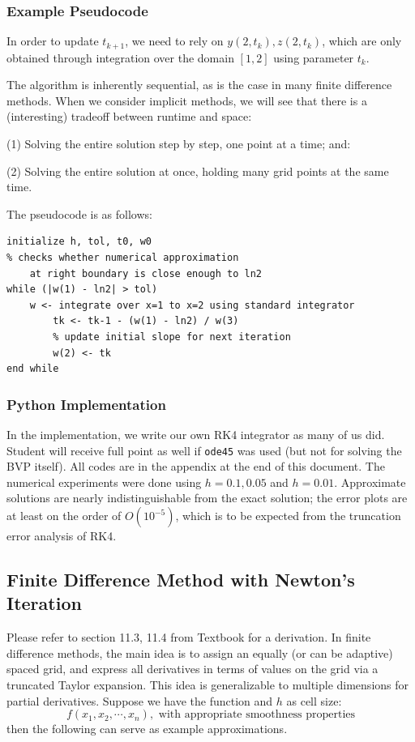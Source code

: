 \documentclass[12pt]{article} %
\newcommand{\1}[1]{\mathds{1}\left[#1\right]}
\begin{document}
\subsubsection{Example Pseudocode}
In order to update $t_{k+1}$, we need to rely on $y(2,t_k), z(2, t_k)$, which are only obtained through integration over the domain $[1,2]$ using parameter $t_k$.

The algorithm is inherently sequential, as is the case in many finite difference methods. When we consider implicit methods, we will see that there is a (interesting) tradeoff between runtime and space:

(1) Solving the entire solution step by step, one point at a time; and:

(2) Solving the entire solution at once, holding many grid points at the same time.

The pseudocode is as follows:
\begin{verbatim}
initialize h, tol, t0, w0
% checks whether numerical approximation 
	at right boundary is close enough to ln2
while (|w(1) - ln2| > tol)
    w <- integrate over x=1 to x=2 using standard integrator
	    tk <- tk-1 - (w(1) - ln2) / w(3)
	    % update initial slope for next iteration
	    w(2) <- tk
end while 
\end{verbatim}
\subsubsection{Python Implementation}
In the implementation, we write our own RK4 integrator as many of us did. Student will receive full point as well if \texttt{ode45} was used (but not for solving the BVP itself). All codes are in the appendix at the end of this document. The numerical experiments were done using $h = 0.1, 0.05$ and $h = 0.01$. Approximate solutions are nearly indistinguishable from the exact solution; the error plots are at least on the order of $O(10^{-5})$, which is to be expected from the truncation error analysis of RK4.




\newpage
\subsection{Finite Difference Method with Newton's Iteration}
Please refer to section 11.3, 11.4 from Textbook for a derivation. In finite difference methods, the main idea is to assign an equally (or can be adaptive) spaced grid, and express all derivatives in terms of values on the grid via a truncated Taylor expansion. This idea is generalizable to multiple dimensions for partial derivatives. Suppose we have the function and $h$ as cell size:
$$
	f(x_1, x_2, \cdots, x_n), \text{ with appropriate smoothness properties}
$$ then the following can serve as example approximations.
\end{document}
